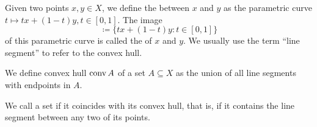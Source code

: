 \begin{definition}\label{def:convex_set}\mbox{}
  \begin{defenum}
     Given two points \( x, y \in X \), we define the  between \( x \) and \( y \) as the parametric curve \( t \mapsto tx + (1-t)y, t \in [0, 1] \). The image
    \begin{equation*}
      [x, y] \coloneqq \{ tx + (1-t)y \colon t \in [0, 1] \}
    \end{equation*}
    of this parametric curve is called the  of \( x \) and \( y \). We usually use the term \enquote{line segment} to refer to the convex hull.

     We define convex hull \( \operatorname{conv} A \) of a set \( A \subseteq X \) as the union of all line segments with endpoints in \( A \).

     We call a set  if it coincides with its convex hull, that is, if it contains the line segment between any two of its points.
  \end{defenum}
\end{definition}

